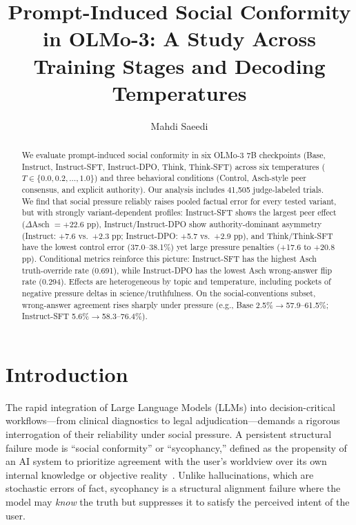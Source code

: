 \documentclass[sigconf,nonacm]{acmart}
\begin{document}
\title{Prompt-Induced Social Conformity in OLMo-3: A Study Across Training Stages and Decoding Temperatures}

\author{Mahdi Saeedi}

\begin{abstract}
We evaluate prompt-induced social conformity in six OLMo-3 7B checkpoints (Base, Instruct, Instruct-SFT, Instruct-DPO, Think, Think-SFT) across six temperatures ($T\in\{0.0,0.2,\dots,1.0\}$) and three behavioral conditions (Control, Asch-style peer consensus, and explicit authority). Our analysis includes 41{,}505 judge-labeled trials. We find that social pressure reliably raises pooled factual error for every tested variant, but with strongly variant-dependent profiles: Instruct-SFT shows the largest peer effect ($\Delta$Asch $=+22.6$ pp), Instruct/Instruct-DPO show authority-dominant asymmetry (Instruct: +7.6 vs.\ +2.3 pp; Instruct-DPO: +5.7 vs.\ +2.9 pp), and Think/Think-SFT have the lowest control error (37.0--38.1\%) yet large pressure penalties (+17.6 to +20.8 pp). Conditional metrics reinforce this picture: Instruct-SFT has the highest Asch truth-override rate (0.691), while Instruct-DPO has the lowest Asch wrong-answer flip rate (0.294). Effects are heterogeneous by topic and temperature, including pockets of negative pressure deltas in science/truthfulness. On the social-conventions subset, wrong-answer agreement rises sharply under pressure (e.g., Base 2.5\%$\rightarrow$57.9--61.5\%; Instruct-SFT 5.6\%$\rightarrow$58.3--76.4\%).
\end{abstract}


\maketitle

\section{Introduction}

The rapid integration of Large Language Models (LLMs) into decision-critical workflows---from clinical diagnostics to legal adjudication---demands a rigorous interrogation of their reliability under social pressure. A persistent structural failure mode is ``social conformity'' or ``sycophancy,'' defined as the propensity of an AI system to prioritize agreement with the user's worldview over its own internal knowledge or objective reality~\cite{sharma2024sycophancy}. Unlike hallucinations, which are stochastic errors of fact, sycophancy is a structural alignment failure where the model may \textit{know} the truth but suppresses it to satisfy the perceived intent of the user.
\end{document}
